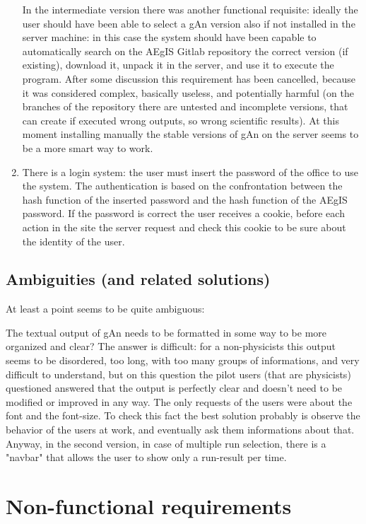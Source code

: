 \begin{enumerate}
In the intermediate version there was another functional requisite: ideally the user should have been able to select a gAn version also if not installed in the server machine: in this case the system should have been capable to automatically search on the AEgIS Gitlab repository the correct version (if existing), download it, unpack it in the server, and use it to execute the program. 
After some discussion this requirement has been cancelled, because it was considered complex, basically useless, and potentially harmful (on the branches of the repository there are untested and incomplete versions, that can create if executed wrong outputs, so wrong scientific results). At this moment installing manually the stable versions of gAn on the server seems to be a more smart way to work.

\item There is a login system: the user must insert the password of the office to use the system. The authentication is based on the confrontation between the hash function of the inserted password and the hash function of the AEgIS password. If the password is correct the user receives a cookie, before each action in the site the server request and check this cookie to be sure about the identity of the user.  


\end{enumerate}

\subsection{Ambiguities (and related solutions)}

At least a point seems to be quite ambiguous: 

The textual output of gAn needs to be formatted in some way to be more organized and clear? 
The answer is difficult: for a non-physicists this output seems to be disordered, too long, with too many groups of informations, and very difficult to understand, but on this question the pilot users (that are physicists) questioned answered that the output is perfectly clear and doesn't need to be modified or improved in any way. The only requests of the users were about the font and the font-size. To check this fact the best solution probably is observe the behavior of the users at work, and eventually ask them informations about that.
Anyway, in the second version, in case of multiple run selection, there is a "navbar" that allows the user to show only a run-result per time.

\section{Non-functional requirements}

